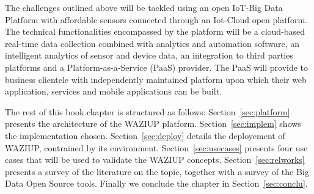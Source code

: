 The challenges outlined above will be tackled using an open IoT-Big Data Platform with affordable sensors connected through an Iot-Cloud open platform. 
The technical functionalities encompassed by the platform will be a cloud-based real-time data collection combined with analytics and automation software, an intelligent analytics of sensor and device data, an integration to third parties platforms and a Platform-as-a-Service (PaaS) provider. 
The PaaS will provide to business clientele with independently maintained platform upon which their web application, services and mobile applications can be built. 

The rest of this book chapter is structured as follows: Section~\ref{sec:platform} presents the architecture of the WAZIUP platform. 
Section~\ref{sec:implem} shows the implementation chosen. 
Section~\ref{sec:deploy} details the deployement of WAZIUP, contrained by its environment.
Section~\ref{sec:usecases} presents four use cases that will be used to validate the WAZIUP concepts.
Section~\ref{sec:relworks} presents a survey of the literature on the topic, together with a survey of the Big Data Open Source tools.
Finally we conclude the chapter in Section~\ref{sec:conclu}.
